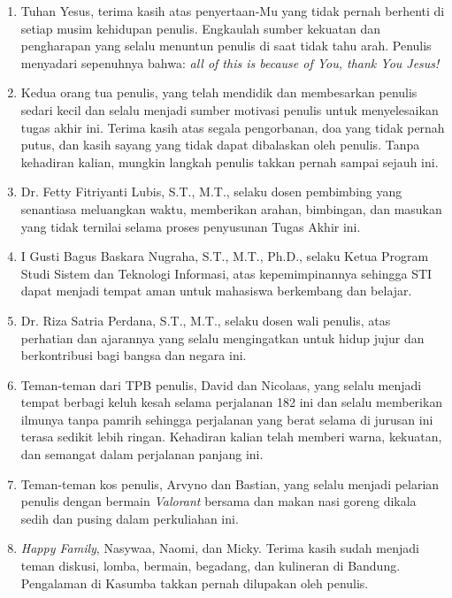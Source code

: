 \begin{enumerate}[1.]
    \item Tuhan Yesus, terima kasih atas penyertaan-Mu yang tidak pernah berhenti di setiap musim kehidupan penulis. Engkaulah sumber kekuatan dan pengharapan yang selalu menuntun penulis di saat tidak tahu arah. Penulis menyadari sepenuhnya bahwa: \textit{all of this is because of You, thank You Jesus!}

    \item Kedua orang tua penulis, yang telah mendidik dan membesarkan penulis sedari kecil dan selalu menjadi sumber motivasi penulis untuk menyelesaikan tugas akhir ini. Terima kasih atas segala pengorbanan, doa yang tidak pernah putus, dan kasih sayang yang tidak dapat dibalaskan oleh penulis. Tanpa kehadiran kalian, mungkin langkah penulis takkan pernah sampai sejauh ini.

    \item Dr. Fetty Fitriyanti Lubis, S.T., M.T., selaku dosen pembimbing yang senantiasa meluangkan waktu, memberikan arahan, bimbingan, dan masukan yang tidak ternilai selama proses penyusunan Tugas Akhir ini.

    \item I Gusti Bagus Baskara Nugraha, S.T., M.T., Ph.D., selaku Ketua Program Studi Sistem dan Teknologi Informasi, atas kepemimpinannya sehingga STI dapat menjadi tempat aman untuk mahasiswa berkembang dan belajar.

    \item Dr. Riza Satria Perdana, S.T., M.T., selaku dosen wali penulis, atas perhatian dan ajarannya yang selalu mengingatkan untuk hidup jujur dan berkontribusi bagi bangsa dan negara ini.

    \item Teman-teman dari TPB penulis, David dan Nicolaas, yang selalu menjadi tempat berbagi keluh kesah selama perjalanan 182 ini dan selalu memberikan ilmunya tanpa pamrih sehingga perjalanan yang berat selama di jurusan ini terasa sedikit lebih ringan. Kehadiran kalian telah memberi warna, kekuatan, dan semangat dalam perjalanan panjang ini.

    \item Teman-teman kos penulis, Arvyno dan Bastian, yang selalu menjadi pelarian penulis dengan bermain \textit{Valorant} bersama dan makan nasi goreng dikala sedih dan pusing dalam perkuliahan ini.

    \item \textit{Happy Family}, Nasywaa, Naomi, dan Micky. Terima kasih sudah menjadi teman diskusi, lomba, bermain, begadang, dan kulineran di Bandung. Pengalaman di Kasumba takkan pernah dilupakan oleh penulis.


\end{enumerate}
